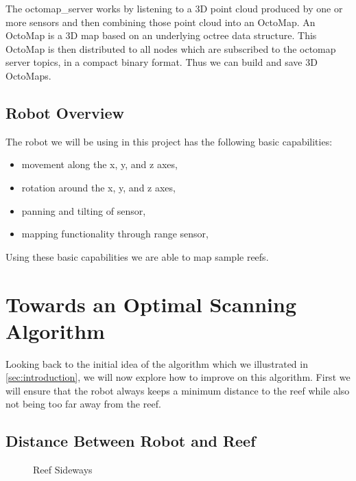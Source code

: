 \documentclass[twoside, 12pt]{article}
\begin{document}
The octomap\_server works by listening to a 3D point cloud produced by one or more sensors and then combining those point cloud into an OctoMap. An OctoMap is a 3D map based on an underlying octree data structure. This OctoMap is then distributed to all nodes which are subscribed to the octomap server topics, in a compact binary format. Thus we can build and save 3D OctoMaps.\\

\subsection{Robot Overview}

The robot we will be using in this project has the following basic capabilities:
\begin{itemize}
\item movement along the x, y, and z axes,
\item rotation around the x, y, and z axes,
\item panning and tilting of sensor,
\item mapping functionality through range sensor,
\end{itemize}

Using these basic capabilities we are able to map sample reefs.

\newpage
\section{Towards an Optimal Scanning Algorithm}
\label{sec:optimalScanningAlgorithm}

Looking back to the initial idea of the algorithm which we illustrated in \autoref{sec:introduction}, we will now explore how to improve on this algorithm. First we will ensure that the robot always keeps a minimum distance to the reef while also not being too far away from the reef.\\

\subsection{Distance Between Robot and Reef}
\label{sec:distanceBetweenRobotAndReef}
\begin{figure}
\vspace{-28pt}
  \begin{center}
  \end{center}
\vspace{-20pt}
  \caption{Reef Sideways}
  \label{fig:reef}
\vspace{20pt}
\end{figure}
\end{document}
